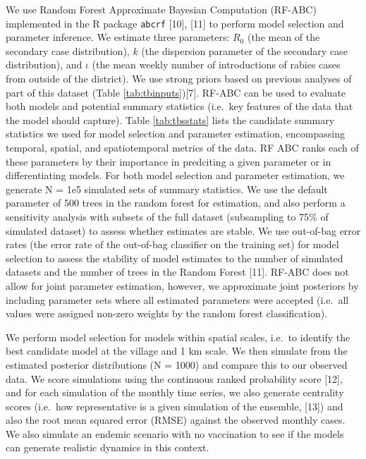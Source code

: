 \documentclass[
]{book}
\begin{document}
We use Random Forest Approximate Bayesian Computation (RF-ABC) implemented in the R package \texttt{abcrf} {[}10{]}, {[}11{]} to perform model selection and parameter inference. We estimate three parameters: \(R_{0}\) (the mean of the secondary case distribution), \(k\) (the dispersion parameter of the secondary case distribution), and \(\iota\) (the mean weekly number of introductions of rabies cases from outside of the district). We use strong priors based on previous analyses of part of this dataset (Table \ref{tab:tbinputs}){[}7{]}. RF-ABC can be used to evaluate both models and potential summary statistics (i.e.~key features of the data that the model should capture). Table \ref{tab:tbsstats} lists the candidate summary statistics we used for model selection and parameter estimation, encompassing temporal, spatial, and spatiotemporal metrics of the data. RF ABC ranks each of these parameters by their importance in predciting a given parameter or in differentiating models. For both model selection and parameter estimation, we generate N = 1e5 simulated sets of summary statistics. We use the default parameter of 500 trees in the random forest for estimation, and also perform a sensitivity analysis with subsets of the full dataset (subsampling to 75\% of simulated dataset) to assess whether estimates are stable. We use out-of-bag error rates (the error rate of the out-of-bag classifier on the training set) for model selection to assess the stability of model estimates to the number of simulated datasets and the number of trees in the Random Forest {[}11{]}. RF-ABC does not allow for joint parameter estimation, however, we approximate joint posteriors by including parameter sets where all estimated parameters were accepted (i.e.~all values were assigned non-zero weights by the random forest classification).

We perform model selection for models within spatial scales, i.e.~to identify the best candidate model at the village and 1 km scale. We then simulate from the estimated posterior distributions (N = 1000) and compare this to our observed data. We score simulations using the continuous ranked probability score {[}12{]}, and for each simulation of the monthly time series, we also generate centrality scores (i.e.~how representative is a given simulation of the ensemble, {[}13{]}) and also the root mean squared error (RMSE) against the observed monthly cases. We also simulate an endemic scenario with no vaccination to see if the models can generate realistic dynamics in this context.
\end{document}
